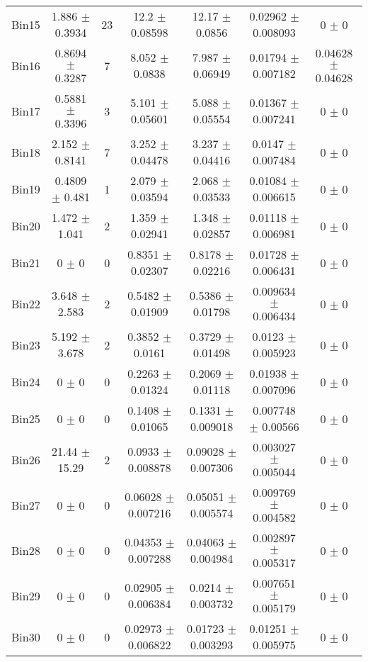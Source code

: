 \begin{tabular}{@{\extracolsep{4pt}}lcccccc@{}}
     Bin15 & 1.886 $\pm$ 0.3934 & 23 & 12.2 $\pm$ 0.08598 & 12.17 $\pm$ 0.0856 & 0.02962 $\pm$ 0.008093 & 0 $\pm$ 0 \\ 
     Bin16 & 0.8694 $\pm$ 0.3287 & 7 & 8.052 $\pm$ 0.0838 & 7.987 $\pm$ 0.06949 & 0.01794 $\pm$ 0.007182 & 0.04628 $\pm$ 0.04628 \\ 
     Bin17 & 0.5881 $\pm$ 0.3396 & 3 & 5.101 $\pm$ 0.05601 & 5.088 $\pm$ 0.05554 & 0.01367 $\pm$ 0.007241 & 0 $\pm$ 0 \\ 
     Bin18 & 2.152 $\pm$ 0.8141 & 7 & 3.252 $\pm$ 0.04478 & 3.237 $\pm$ 0.04416 & 0.0147 $\pm$ 0.007484 & 0 $\pm$ 0 \\ 
     Bin19 & 0.4809 $\pm$ 0.481 & 1 & 2.079 $\pm$ 0.03594 & 2.068 $\pm$ 0.03533 & 0.01084 $\pm$ 0.006615 & 0 $\pm$ 0 \\ 
     Bin20 & 1.472 $\pm$ 1.041 & 2 & 1.359 $\pm$ 0.02941 & 1.348 $\pm$ 0.02857 & 0.01118 $\pm$ 0.006981 & 0 $\pm$ 0 \\ 
     Bin21 & 0 $\pm$ 0 & 0 & 0.8351 $\pm$ 0.02307 & 0.8178 $\pm$ 0.02216 & 0.01728 $\pm$ 0.006431 & 0 $\pm$ 0 \\ 
     Bin22 & 3.648 $\pm$ 2.583 & 2 & 0.5482 $\pm$ 0.01909 & 0.5386 $\pm$ 0.01798 & 0.009634 $\pm$ 0.006434 & 0 $\pm$ 0 \\ 
     Bin23 & 5.192 $\pm$ 3.678 & 2 & 0.3852 $\pm$ 0.0161 & 0.3729 $\pm$ 0.01498 & 0.0123 $\pm$ 0.005923 & 0 $\pm$ 0 \\ 
     Bin24 & 0 $\pm$ 0 & 0 & 0.2263 $\pm$ 0.01324 & 0.2069 $\pm$ 0.01118 & 0.01938 $\pm$ 0.007096 & 0 $\pm$ 0 \\ 
     Bin25 & 0 $\pm$ 0 & 0 & 0.1408 $\pm$ 0.01065 & 0.1331 $\pm$ 0.009018 & 0.007748 $\pm$ 0.00566 & 0 $\pm$ 0 \\ 
     Bin26 & 21.44 $\pm$ 15.29 & 2 & 0.0933 $\pm$ 0.008878 & 0.09028 $\pm$ 0.007306 & 0.003027 $\pm$ 0.005044 & 0 $\pm$ 0 \\ 
     Bin27 & 0 $\pm$ 0 & 0 & 0.06028 $\pm$ 0.007216 & 0.05051 $\pm$ 0.005574 & 0.009769 $\pm$ 0.004582 & 0 $\pm$ 0 \\ 
     Bin28 & 0 $\pm$ 0 & 0 & 0.04353 $\pm$ 0.007288 & 0.04063 $\pm$ 0.004984 & 0.002897 $\pm$ 0.005317 & 0 $\pm$ 0 \\ 
     Bin29 & 0 $\pm$ 0 & 0 & 0.02905 $\pm$ 0.006384 & 0.0214 $\pm$ 0.003732 & 0.007651 $\pm$ 0.005179 & 0 $\pm$ 0 \\ 
     Bin30 & 0 $\pm$ 0 & 0 & 0.02973 $\pm$ 0.006822 & 0.01723 $\pm$ 0.003293 & 0.01251 $\pm$ 0.005975 & 0 $\pm$ 0 \\ 
\hline\hline
  \end{tabular}
